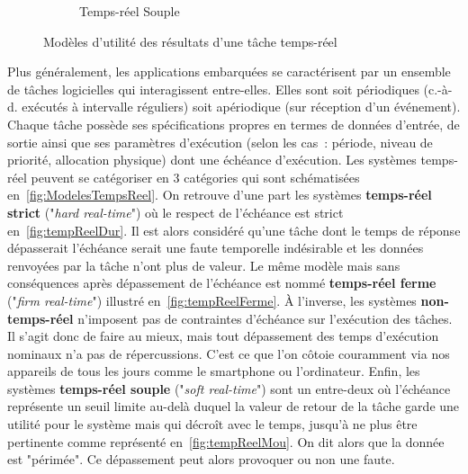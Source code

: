 \documentclass[french, a4paper, 11pt, twoside, pdftex]{StyleThese}
\begin{document}
\begin{figure}[h!]
\begin{subfigure}{.3\textwidth}
				\caption[]{Temps-réel Souple}
				\label{fig:tempReelMou}
			\end{subfigure}
			\caption{Modèles d'utilité des résultats d'une tâche temps-réel}
			\label{fig:ModelesTempsReel}
		\end{figure}
		
		Plus généralement, les applications embarquées se caractérisent par un ensemble de tâches logicielles qui interagissent entre-elles. Elles sont soit périodiques (c.-à-d. exécutés à intervalle réguliers) soit apériodique (sur réception d'un événement). Chaque tâche possède ses spécifications propres en termes de données d'entrée, de sortie ainsi que ses paramètres d'exécution (selon les cas : période, niveau de priorité, allocation physique) dont une échéance d'exécution. Les systèmes temps-réel peuvent se catégoriser en 3 catégories qui sont schématisées en~\autoref{fig:ModelesTempsReel}. On retrouve d'une part les systèmes \textbf{temps-réel strict} ("\textit{hard real-time}") où le respect de l'échéance est strict en~\autoref{fig:tempReelDur}. Il est alors considéré qu'une tâche dont le temps de réponse dépasserait l'échéance serait une faute temporelle indésirable et les données renvoyées par la tâche n'ont plus de valeur. Le même modèle mais sans conséquences après dépassement de l'échéance est nommé \textbf{temps-réel ferme} ("\textit{firm real-time}") illustré en~\autoref{fig:tempReelFerme}. À l'inverse, les systèmes \textbf{non-temps-réel} n'imposent pas de contraintes d'échéance sur l'exécution des tâches. Il s'agit donc de faire au mieux, mais tout dépassement des temps d'exécution nominaux n'a pas de répercussions. C'est ce que l'on côtoie couramment via nos appareils de tous les jours comme le smartphone ou l'ordinateur. Enfin, les systèmes \textbf{temps-réel souple} ("\textit{soft real-time}") sont un entre-deux où l'échéance représente un seuil limite au-delà duquel la valeur de retour de la tâche garde une utilité pour le système mais qui décroît avec le temps, jusqu'à ne plus être pertinente comme représenté en~\autoref{fig:tempReelMou}. On dit alors que la donnée est "périmée". Ce dépassement peut alors provoquer ou non une faute.
		
\end{document}
